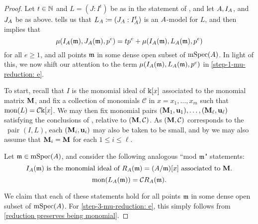 \documentclass{amsart}
\begin{document}
\begin{proof}  Let $t \in \mathbb{N}$ and $L = (J: I^t)$ be as in the statement of , and let $A, I_A$, and $J_A$ be as above.   tells us that $L_A \coloneqq (J_A: I_A^t)$ is an $A$-model for $L$, and  then implies that
\begin{equation}
\label{step-1-mu-reduction: e}
\mu(I_A(\mathfrak{m}), J_A(\mathfrak{m}), p^e) = t p^e + \mu(I_A(\mathfrak{m}), L_A(\mathfrak{m}), p^e)
 \end{equation}
%
for all $e \geq 1$, and all points $\mathfrak{m}$ in some dense open subset of $\operatorname{mSpec}(A)$.  In light of this, we now shift our attention to the  term $\mu(I_A(\mathfrak{m}), L_A(\mathfrak{m}), p^e)$ in \eqref{step-1-mu-reduction: e}.  

To start, recall that $I$ is the monomial ideal of $\Bbbk[x]$ associated to the monomial matrix $\mathbf{M}$, and fix a collection of monomials $\mathcal{C}$ in $x=x_1, \ldots, x_m$ such that $\operatorname{mon}(L) = \mathcal{C} \Bbbk[x]$.   We may then fix monomial pairs $(\mathbf{M}_1, \mathbf{u}_1), \ldots, (\mathbf{M}_{\ell}, \mathbf{u}_{\ell})$ satisfying the conclusions of , relative to $(\mathbf{M}, \mathcal{C})$.  As $(\mathbf{M}, \mathcal{C})$ corresponds to the \smallcompatible\ pair $(I, L)$, each $(\mathbf{M}_i, \mathbf{u}_i)$ may also be taken to be small, and by  we may also assume that $\mathbf{M}_i = \mathbf{M}$ for each $1 \leq i \leq \ell$. 

Let $\mathfrak{m} \in \operatorname{mSpec}(A)$, and consider the following analogous ``mod $\mathfrak{m}$" statements:
%
\begin{equation}
\label{step-3-mu-reduction: e}
\text{$I_A(\mathfrak{m})$ is the monomial ideal of $R_A(\mathfrak{m}) = (A/\mathfrak{m})[x]$ associated to $\mathbf{M}$.}
\end{equation}
%
\begin{equation}
\label{step-2-mu-reduction: e}
\operatorname{mon}(L_A(\mathfrak{m})) = \mathcal{C} R_A(\mathfrak{m}).
\end{equation}


We claim that each of these statements hold for all points $\mathfrak{m}$ in some dense open subset of $\operatorname{mSpec}(A)$.  For \eqref{step-3-mu-reduction: e}, this simply follows from  \ref{reduction preserves being monomial}.  


\end{proof}
\end{document}
